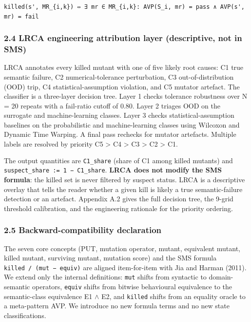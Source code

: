 \documentclass[review,12pt,authoryear]{elsarticle}
\begin{document}
\begin{verbatim}
killed(s', MR_{i,k}) ⇔ ∃ mr ∈ MR_{i,k}: AVP(S_i, mr) = pass ∧ AVP(s', mr) = fail
\end{verbatim}

\subsubsection{2.4 LRCA engineering attribution layer (descriptive, not
in
SMS)}\label{lrca-engineering-attribution-layer-descriptive-not-in-sms}

LRCA annotates every killed mutant with one of five likely root causes:
C1 true semantic failure, C2 numerical-tolerance perturbation, C3
out-of-distribution (OOD) trip, C4 statistical-assumption violation, and
C5 mutator artefact. The classifier is a three-layer decision tree.
Layer 1 checks tolerance robustness over N = 20 repeats with a
fail-ratio cutoff of 0.80. Layer 2 triages OOD on the surrogate and
machine-learning classes. Layer 3 checks statistical-assumption
baselines on the probabilistic and machine-learning classes using
Wilcoxon and Dynamic Time Warping. A final pass rechecks for mutator
artefacts. Multiple labels are resolved by priority C5 \textgreater{} C4
\textgreater{} C3 \textgreater{} C2 \textgreater{} C1.

The output quantities are \texttt{C1\_share} (share of C1 among killed
mutants) and \texttt{suspect\_share\ :=\ 1\ −\ C1\_share}. \textbf{LRCA
does not modify the SMS formula}: the killed set is never filtered by
suspect status. LRCA is a descriptive overlay that tells the reader
whether a given kill is likely a true semantic-failure detection or an
artefact. Appendix A.2 gives the full decision tree, the 9-grid
threshold calibration, and the engineering rationale for the priority
ordering.

\subsubsection{2.5 Backward-compatibility
declaration}\label{backward-compatibility-declaration}

The seven core concepts (PUT, mutation operator, mutant, equivalent
mutant, killed mutant, surviving mutant, mutation score) and the SMS
formula
\texttt{\textbar{}killed\textbar{}\ /\ (\textbar{}mut\textbar{}\ −\ \textbar{}equiv\textbar{})}
are aligned item-for-item with Jia and Harman (2011). We extend only the
internal definitions: \texttt{mut} shifts from syntactic to
domain-semantic operators, \texttt{equiv} shifts from bitwise
behavioural equivalence to the semantic-class equivalence E1 $\wedge$ E2, and
\texttt{killed} shifts from an equality oracle to a meta-pattern AVP. We
introduce no new formula terms and no new state classifications.
\end{document}
